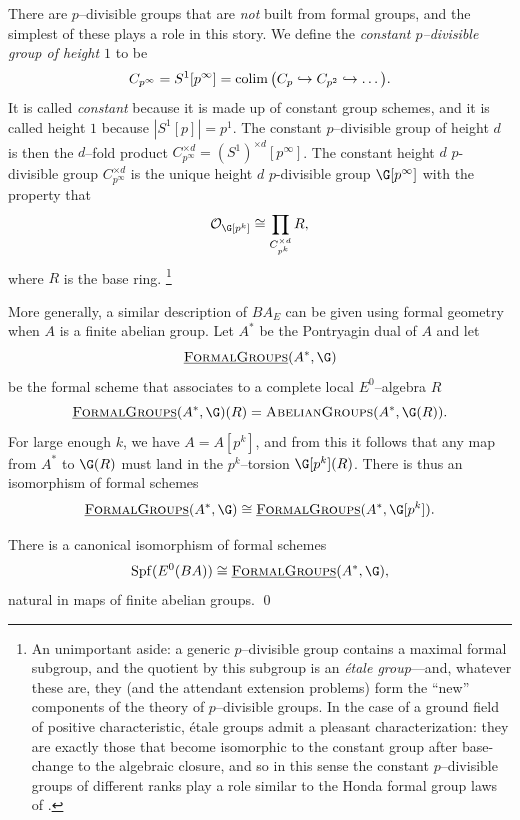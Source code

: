 There are \(p\)--divisible groups that are \emph{not} built from formal groups, and the simplest of these plays a role in this story.
We define the \textit{constant \(p\)--divisible group of height \(1\)} to be 
\[
C_{p^{\infty}} = S^1[p^\infty] = \operatorname*{colim} \big ( C_p \hookrightarrow C_{p^2} \hookrightarrow \ldots \big ).
\]
It is called \textit{constant} because it is made up of constant group schemes, and it is called height \(1\) because \(|S^1[p]| = p^1\).
The constant \(p\)--divisible group of height \(d\) is then the \(d\)--fold product \(C_{p^\infty}^{\times d} = (S^1)^{\times d}[p^\infty]\).
The constant height \(d\) \(p\)-divisible group \(C_{p^\infty}^{\times d}\) is the unique height \(d\) \(p\)-divisible group $\G[p^{\infty}]$ with the property that
\[
\sheaf O_{\G[p^k]} \cong \prod_{C_{p^k}^{\times d}}R,
\]
where $R$ is the base ring.%
\footnote{%
    An unimportant aside: a generic \(p\)--divisible group contains a maximal formal subgroup, and the quotient by this subgroup is an \textit{\'etale group}---and, whatever these are, they (and the attendant extension problems) form the ``new'' components of the theory of \(p\)--divisible groups.
    In the case of a ground field of positive characteristic, \'etale groups admit a pleasant characterization: they are exactly those that become isomorphic to the constant group after base-change to the algebraic closure, and so in this sense the constant \(p\)--divisible groups of different ranks play a role similar to the Honda formal group laws of .
}


More generally, a similar description of \(BA_{E}\) can be given using formal geometry when \(A\) is a finite abelian group.
Let \(A^*\) be the Pontryagin dual of \(A\) and let
\[
\InternalHom{FormalGroups}(A^*, \G)
\]
be the formal scheme that associates to a complete local \(E^0\)--algebra \(R\)
\[
\InternalHom{FormalGroups}(A^*, \G)(R) = \CatOf{AbelianGroups}(A^*, \G(R)).
\]
For large enough \(k\), we have \(A = A[p^k]\), and from this it follows that any map from \(A^*\) to \(\G(R)\) must land in the \(p^k\)--torsion \(\G[p^k](R)\).
There is thus an isomorphism of formal schemes
\[
\InternalHom{FormalGroups}(A^*, \G) \cong \InternalHom{FormalGroups}(A^*, \G[p^k]).
\]
\begin{proposition} \label{app:abeliangroupdualhom}
There is a canonical isomorphism of formal schemes
\[
\Spf(E^0(BA)) \cong \InternalHom{FormalGroups}(A^*, \G),
\]
natural in maps of finite abelian groups.
\qed
\end{proposition}


